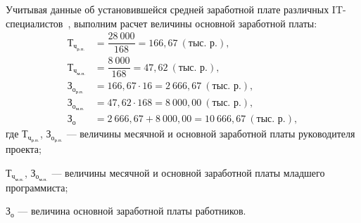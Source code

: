 Учитывая данные об установившейся средней заработной
плате различных IT-специалистов~\cite{dev_by_salaries},
выполним расчет величины основной заработной платы:
\begin{equation}
  \label{eq:teo_salary}
  \begin{aligned}
    \text{Т}_{\text{ч}_{\text{р.п.}}}& = \dfrac{28 \: 000}{168} = 166{,}67 \: (\text{тыс. р.}), \\[1mm]
    \text{Т}_{\text{ч}_{\text{м.п.}}}& = \dfrac{8 \: 000}{168}  = 47{,}62 \: (\text{тыс. р.}), \\[1mm]
    \text{З}_{\text{о}_{\text{р.п.}}}& = 166{,}67 \cdot 16 = 2 \: 666{,}67 \: (\text{тыс. р.}), \\
    \text{З}_{\text{о}_{\text{м.п.}}}& = 47{,}62 \cdot 168 = 8 \: 000{,}00 \: (\text{тыс. р.}), \\
    \text{З}_{\text{о}}& = 2 \: 666{,}67 + 8 \: 000{,}00 = 10 \:666{,}67 \: (\text{тыс. р.}),
  \end{aligned}
\end{equation}
\noindent где
\( \text{Т}_{\text{ч}_{\text{р.п.}}} \), \( \text{З}_{\text{о}_{\text{р.п.}}} \)
--- величины месячной и основной заработной платы руководителя проекта; \par
\noindent \hspace{6.2mm} \( \text{Т}_{\text{ч}_{\text{м.п.}}} \), \( \text{З}_{\text{о}_{\text{м.п.}}} \) --- величины месячной и основной заработной платы младшего программиста; \par
\noindent \hspace{6.2mm} \( \text{З}_{\text{о}} \) --- величина основной
заработной платы работников.

\pagebreak

